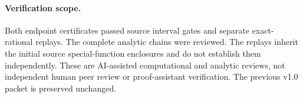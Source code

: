 \paragraph{Verification scope.} Both endpoint certificates passed source interval gates and separate exact-rational replays. The complete analytic chains were reviewed. The replays inherit the initial source special-function enclosures and do not establish them independently. These are AI-assisted computational and analytic reviews, not independent human peer review or proof-assistant verification. The previous v1.0 packet is preserved unchanged.
